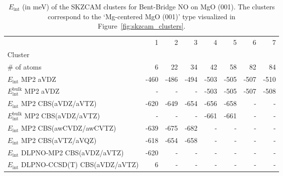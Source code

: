 \begin{table}
\caption{\label{tab:system_eint_mgo_no_bent-bridge}$E_\textrm{int}$ (in meV) of the SKZCAM clusters for Bent-Bridge NO on MgO (001). The clusters correspond to the `Mg-centered MgO (001)' type visualized in Figure~\ref{fig:skzcam_clusters}.}
\begin{adjustbox}{center,max width=1.4\textwidth}
\begin{tabular}{lrrrrrrr}
\toprule
 & 1 & 2 & 3 & 4 & 5 & 6 & 7 \\ 
Cluster &  &  &  &  &  &  &  \\
\midrule
\# of atoms & 6 & 22 & 34 & 42 & 58 & 82 & 84 \\
$E_\textrm{int}$ MP2 aVDZ & -460 & -486 & -494 & -503 & -505 & -507 & -510 \\
$E_\textrm{int}^\textrm{bulk}$ MP2 aVDZ & - & - & - & -503 & -505 & -507 & -508 \\
$E_\textrm{int}$ MP2 CBS(aVDZ/aVTZ) & -620 & -649 & -654 & -656 & -658 & - & - \\
$E_\textrm{int}^\textrm{bulk}$ MP2 CBS(aVDZ/aVTZ) & - & - & - & -661 & -661 & - & - \\
$E_\textrm{int}$ MP2 CBS(awCVDZ/awCVTZ) & -639 & -675 & -682 & - & - & - & - \\
$E_\textrm{int}$ MP2 CBS(aVTZ/aVQZ) & -618 & -654 & -658 & - & - & - & - \\
$E_\textrm{int}$ DLPNO-MP2 CBS(aVDZ/aVTZ) & -620 & - & - & - & - & - & - \\
$E_\textrm{int}$ DLPNO-CCSD(T) CBS(aVDZ/aVTZ) & 6 & - & - & - & - & - & - \\
\bottomrule
\end{tabular}
\end{adjustbox}
\end{table}

